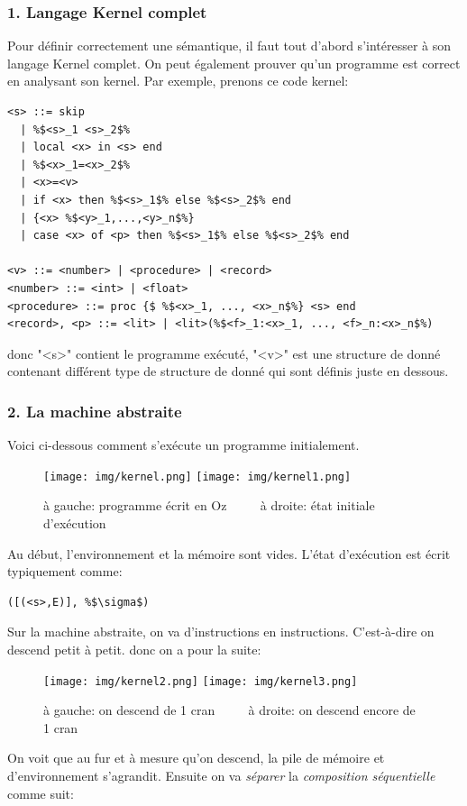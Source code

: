 \documentclass{report}
\begin{document}
\subsubsection{1. Langage Kernel complet}
Pour définir correctement une sémantique, il faut tout d'abord s'intéresser à son langage Kernel complet. On peut également prouver qu'un programme est correct en analysant son kernel. Par exemple, prenons ce code kernel:
\begin{lstlisting}[escapechar=\%]
<s> ::= skip 
  | %$<s>_1 <s>_2$% 
  | local <x> in <s> end 
  | %$<x>_1=<x>_2$% 
  | <x>=<v> 
  | if <x> then %$<s>_1$% else %$<s>_2$% end 
  | {<x> %$<y>_1,...,<y>_n$%} 
  | case <x> of <p> then %$<s>_1$% else %$<s>_2$% end

<v> ::= <number> | <procedure> | <record>  
<number> ::= <int> | <float> 
<procedure> ::= proc {$ %$<x>_1, ..., <x>_n$%} <s> end
<record>, <p> ::= <lit> | <lit>(%$<f>_1:<x>_1, ..., <f>_n:<x>_n$%)
\end{lstlisting}
donc "<s>" contient le programme exécuté, "<v>" est une structure de donné contenant différent type de structure de donné qui sont définis juste en dessous. 

\subsubsection{2. La machine abstraite}
Voici ci-dessous comment s'exécute un programme initialement.

\begin{figure}[H]
\centering
\texttt{[image: img/kernel.png]}
\texttt{[image: img/kernel1.png]}
\caption{à gauche: programme écrit en Oz $\qquad$ à droite: état initiale d'exécution}
\end{figure}
Au début, l'environnement et la mémoire sont vides. L'état d'exécution est écrit typiquement comme:
\begin{lstlisting}[escapechar=\%]
([(<s>,E)], %$\sigma$)
\end{lstlisting} %
Sur la machine abstraite, on va d'instructions en instructions. C'est-à-dire on descend petit à petit.
donc on a pour la suite:
\begin{figure}[H]
\centering
\texttt{[image: img/kernel2.png]}
\texttt{[image: img/kernel3.png]}
\caption{à gauche: on descend de 1 cran $\qquad$ à droite: on descend encore de 1 cran}
\end{figure}
On voit que au fur et à mesure qu'on descend, la pile de mémoire et d'environnement s'agrandit. Ensuite on va \textit{séparer} la \textit{composition séquentielle} comme suit:
\end{document}
